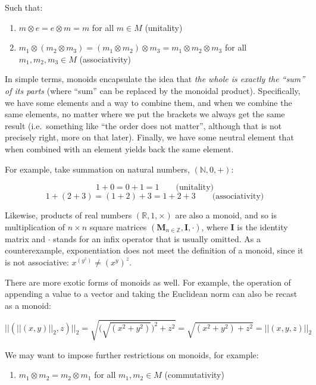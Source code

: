 \documentclass[
]{book}
\providecommand{\tightlist}{%
  \setlength{\itemsep}{0pt}\setlength{\parskip}{0pt}}
\theoremstyle{definition}
\theoremstyle{definition}
\theoremstyle{definition}
\theoremstyle{definition}
\theoremstyle{remark}
\begin{document}
Such that:

\begin{enumerate}
\def\labelenumi{\arabic{enumi}.}
\tightlist
\item
  \(m \otimes e = e \otimes m = m\) for all \(m \in M\) (unitality)
\item
  \(m_1 \otimes (m_2 \otimes m_3) = (m_1 \otimes m_2) \otimes m_3 = m_1 \otimes m_2 \otimes m_3\) for all \(m_1, m_2, m_3 \in M\) (associativity)
\end{enumerate}

In simple terms, monoids encapsulate the idea that \emph{the whole is exactly the ``sum'' of its parts} (where ``sum'' can be replaced by the monoidal product). Specifically, we have some elements and a way to combine them, and when we combine the same elements, no matter where we put the brackets we always get the same result (i.e.~something like ``the order does not matter'', although that is not precisely right, more on that later). Finally, we have some neutral element that when combined with an element yields back the same element.

For example, take summation on natural numbers, \((\mathbb{N}, 0, +)\):

\[1 + 0 = 0 + 1 = 1 \qquad \text{(unitality)}\]
\[1 + (2 + 3) = (1 + 2) + 3 = 1 + 2 + 3 \qquad \text{(associativity)}\]

Likewise, products of real numbers \((\mathbb{R}, 1, \times)\) are also a monoid, and so is multiplication of \(n \times n\) square matrices \((\mathbf{M}_{n \in \mathbb{Z}}, \mathbf{I}, \cdot)\), where \(\mathbf{I}\) is the identity matrix and \(\cdot\) stands for an infix operator that is usually omitted. As a counterexample, exponentiation does not meet the definition of a monoid, since it is not associative: \(x^{(y^z)} \neq (x^y)^z\).

There are more exotic forms of monoids as well. For example, the operation of appending a value to a vector and taking the Euclidean norm can also be recast as a monoid:

\[||(||(x, y)||_2, z)||_2 = \sqrt{\bigg(\sqrt{(x^2 + y^2)}\bigg)^2 + z^2} = \sqrt{(x^2 + y^2) + z^2} = ||(x, y, z)||_2\]

We may want to impose further restrictions on monoids, for example:

\begin{enumerate}
\def\labelenumi{\arabic{enumi}.}
\setcounter{enumi}{2}
\tightlist
\item
  \(m_1 \otimes m_2 = m_2 \otimes m_1\) for all \(m_1, m_2 \in M\) (commutativity)
\end{enumerate}
\end{document}
